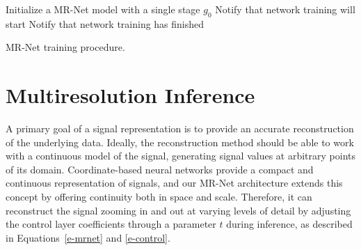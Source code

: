 \begin{algorithm}[hbt!]
    Initialize a MR-Net model with a single stage $g_0$\;
    Notify that network training will start\;
    Notify that network training has finished\;
    \caption{MR-Net training procedure.} 
    \label{alg:mr-training}
\end{algorithm}

\section{Multiresolution Inference}

A primary goal of a signal representation is to provide an accurate reconstruction of the underlying data. Ideally, the reconstruction method should be able to work with a continuous model of the signal, generating signal values at arbitrary points of its domain. Coordinate-based neural networks provide a compact and continuous representation of signals, and our MR-Net architecture extends this concept by offering continuity both in space and scale. Therefore, it can reconstruct the signal zooming in and out at varying levels of detail by adjusting the control layer coefficients through a parameter $t$ during inference, as described in Equations~\ref{e-mrnet} and \ref{e-control}.

